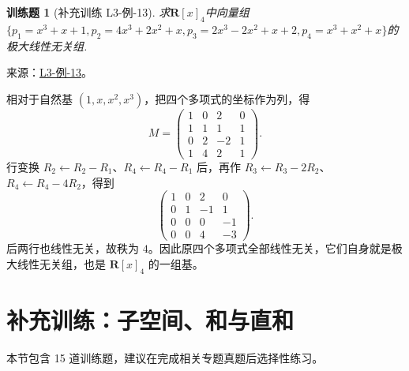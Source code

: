 \documentclass[12pt,fontset=fandol]{ctexart}
\newtheorem{exercise}{训练题}[section]
\begin{document}
\begin{exercise}[补充训练 L3-例-13]\label{prob:L3-例-13}
求$\mathbf{R}[x]_4$中向量组$\{p_1=x^3+x+1,p_2=4x^3+2x^2+x,p_3=2x^3-2x^2+x+2,p_4=x^3+x^2+x\}$的极大线性无关组.
\end{exercise}
\noindent 来源：\href{https://github.com/yhwu-is/Linear-Algebra-Left-Undone/blob/new/%E8%AE%B2%E4%B9%89/%E4%B8%93%E9%A2%98/3%20%E6%9C%89%E9%99%90%E7%BB%B4%E7%BA%BF%E6%80%A7%E7%A9%BA%E9%97%B4.tex}{L3-例-13}。
\begin{solve}
相对于自然基 $(1,x,x^2,x^3)$，把四个多项式的坐标作为列，得
\[M=\begin{pmatrix}1&0&2&0\\1&1&1&1\\0&2&-2&1\\1&4&2&1\end{pmatrix}.\]
行变换 $R_2\leftarrow R_2-R_1$、$R_4\leftarrow R_4-R_1$ 后，再作 $R_3\leftarrow R_3-2R_2$、$R_4\leftarrow R_4-4R_2$，得到
\[\begin{pmatrix}1&0&2&0\\0&1&-1&1\\0&0&0&-1\\0&0&4&-3\end{pmatrix}.\]
后两行也线性无关，故秩为 $4$。因此原四个多项式全部线性无关，它们自身就是极大线性无关组，也是 $\mathbf R[x]_4$ 的一组基。
\end{solve}

\section{补充训练：子空间、和与直和}

本节包含 15 道训练题，建议在完成相关专题真题后选择性练习。
\end{document}
